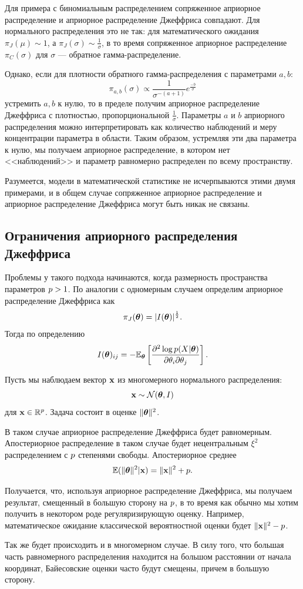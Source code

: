 Для примера с биномиальным распределением сопряженное априорное распределение и априорное распределение Джеффриса совпадают.
Для нормального распределения это не так: для математического ожидания $\pi_J(\mu) \sim 1$, а $\pi_J(\sigma) \sim \frac{1}{\sigma}$,
в то время сопряженное априорное распределение $\pi_C(\sigma)$ для $\sigma$ --- обратное гамма-распределение.

Однако, если для плотности обратного гамма-распределения с параметрами $a, b$:
\[
\pi_{a, b}(\sigma) \propto \frac1{\sigma^{-(a + 1)}} e^{\frac{-b}{\sigma}}
\]
устремить $a, b$ к нулю, то в пределе получим априорное распределение Джеффриса с плотностью, пропорциональной $\frac{1}{\sigma}$.
Параметры $a$ и $b$ априорного распределения можно интерпретировать как количество наблюдений и меру концентрации параметра в области.
Таким образом, устремляя эти два параметра к нулю, мы получаем априорное распределение, в котором нет <<наблюдений>> и параметр равномерно распределен по всему пространству.

Разумеется, модели в математической статистике не исчерпываются этими двумя примерами, и в общем случае сопряженное априорное распределение и априорное распределение Джеффриса могут быть никак не связаны.

\subsection{Ограничения априорного распределения Джеффриса}

Проблемы у такого подхода начинаются, когда размерность пространства параметров $p > 1$. 
По аналогии с одномерным случаем определим априорное распределение Джеффриса как 
\[
\pi_J(\boldsymbol{\theta}) = |I(\boldsymbol{\theta})|^{\frac12}.
\]
Тогда по определению
\[
I(\boldsymbol{\theta})_{ij} = -\mathbb{E}_{\boldsymbol{\theta}} \left[ \frac{\partial^2 \log p(X | \boldsymbol{\theta})}{\partial \theta_i \partial \theta_j} \right].
\]

\begin{example}
Пусть мы наблюдаем вектор $\mathbf{x}$ из многомерного нормального распределения: 
\[
\mathbf{x} \sim \mathcal{N}(\boldsymbol{\theta}, I)
\]
для $\mathbf{x} \in \mathbb{R}^{p}$.
Задача состоит в оценке $\|\boldsymbol{\theta}\|^2$.

В таком случае априорное распределение Джеффриса будет равномерным.
Апостериорное распределение в таком случае будет нецентральным $\xi^2$ распределением с $p$ степенями свободы.
Апостериорное среднее
\[
\mathbb{E} (\|\boldsymbol{\theta} \|^2 | \mathbf{x}) = \|\mathbf{x} \|^2 + p.
\]

Получается, что, используя априорное распределение Джеффриса, мы получаем результат, смещенный в большую сторону на $p$,
в то время как обычно мы хотим получить в некотором роде регуляризирующую оценку.
Например, математическое ожидание классической вероятностной оценки будет $\|\mathbf{x} \|^2 - p$.

Так же будет происходить и в многомерном случае.
В силу того, что большая часть равномерного распределения находится на большом расстоянии от начала координат, 
Байесовские оценки часто будут смещены, причем в большую сторону.
\end{example}

